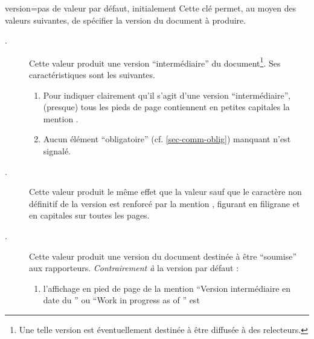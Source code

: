 {
  \begin{docKey}{version}{=\textbar{}\textbar{}\textbar{}\textbar{}\textbar{}}{pas
      de valeur par défaut, initialement }
    Cette clé permet, au moyen des valeurs suivantes, de spécifier la version du
    document à produire.
    \begin{description}
    \item[.]%
      Cette valeur produit une version
      \enquote{intermédiaire} du document\footnote{Une telle version est
        éventuellement destinée à être diffusée à des relecteurs.}. Ses
      caractéristiques sont les suivantes.
      \begin{enumerate}
      \item\label{item:inprogress:1} Pour indiquer clairement qu'il s'agit d'une
        version \enquote{intermédiaire}, (presque) tous les pieds de
        page contiennent en petites capitales la mention
        .
      \item\label{item:inprogress:2} Aucun élément \enquote{obligatoire}
        (cf. \vref{sec-comm-oblig}) manquant n'est signalé.
      \end{enumerate}
    \item[.]%
      Cette valeur produit le même effet que la valeur 
      sauf que le caractère non définitif de la version est renforcé par la
      mention , figurant en
      filigrane et en capitales sur toutes les pages.
    \item[.]%
      Cette valeur produit une version du document
      destinée à être \enquote{soumise} aux rapporteurs. \emph{Contrairement à}
      la version par défaut :
      \begin{enumerate}
      \item l'affichage en pied de page de la mention
        \enquote{Version intermédiaire en date du } ou
        \foreignquote{english}{Work in progress as of } est

\end{enumerate}
\end{description}
\end{docKey}}
